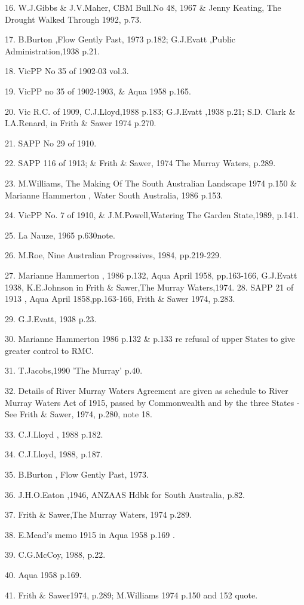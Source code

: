 16. W.J.Gibbs \& J.V.Maher, CBM Bull.No 48, 1967 \& Jenny Keating, The
      Drought Walked Through 1992, p.73.

17.  B.Burton ,Flow Gently Past, 1973 p.182; G.J.Evatt ,Public 
      Administration,1938 p.21.

18. VicPP No 35 of 1902-03 vol.3.

19. VicPP no 35 of 1902-1903, \& Aqua 1958 p.165.

20. Vic R.C. of 1909, C.J.Lloyd,1988 p.183; G.J.Evatt ,1938 p.21; S.D. Clark 
      \& I.A.Renard, in Frith \& Sawer 1974 p.270.

21. SAPP No 29 of 1910.

22. SAPP 116 of 1913; \& Frith \& Sawer, 1974 The Murray Waters, p.289.

23. M.Williams, The Making Of The South Australian Landscape 1974 p.150 
       \& Marianne Hammerton , Water South Australia, 1986 p.153.

24. VicPP No. 7 of 1910, \& J.M.Powell,Watering The Garden State,1989, 
       p.141.

25. La Nauze, 1965 p.630note.

26. M.Roe, Nine Australian Progressives, 1984,  pp.219-229.

27. Marianne Hammerton , 1986 p.132,   Aqua April 1958, pp.163-166,  
       G.J.Evatt 1938,  K.E.Johnson in Frith \& Sawer,The Murray Waters,1974.    
28. SAPP 21 of 1913 , Aqua April 1858,pp.163-166, Frith \& Sawer 1974, 
      p.283.

29. G.J.Evatt, 1938 p.23.

30. Marianne Hammerton 1986  p.132 \& p.133 re refusal of upper States  
      to give greater control to RMC.

31. T.Jacobs,1990  'The Murray' p.40.

32. Details of River Murray Waters Agreement are given as schedule to River 
      Murray Waters Act of 1915, passed by Commonwealth and by the three
      States - See  Frith \& Sawer, 1974, p.280, note 18.

33. C.J.Lloyd , 1988  p.182.

34. C.J.Lloyd, 1988, p.187.

35. B.Burton , Flow Gently Past, 1973.

36. J.H.O.Eaton ,1946, ANZAAS Hdbk for South Australia, p.82.

37. Frith \& Sawer,The Murray Waters, 1974 p.289.

38. E.Mead's memo 1915 in   Aqua 1958 p.169 .

39. C.G.McCoy, 1988, p.22.

40. Aqua 1958 p.169.

41. Frith \& Sawer1974, p.289; M.Williams 1974 p.150 and 152 quote.
      
	
            


